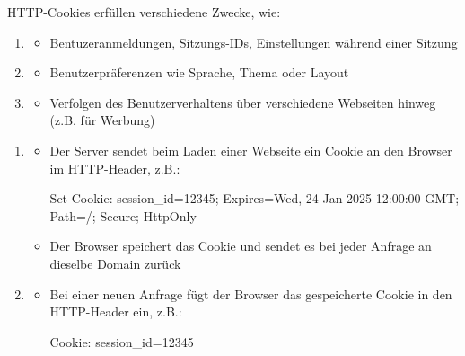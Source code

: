 \begin{infoBox}[title=Funktionen von Cookies]
    HTTP-Cookies erfüllen verschiedene Zwecke, wie:
    \begin{enumerate}
        \item {}
        \begin{itemize}
            \item Bentuzeranmeldungen, Sitzungs-IDs, Einstellungen während einer Sitzung
        \end{itemize}
        \item {}
        \begin{itemize}
            \item Benutzerpräferenzen wie Sprache, Thema oder Layout
        \end{itemize}
        \item {}
        \begin{itemize}
            \item Verfolgen des Benutzerverhaltens über verschiedene Webseiten hinweg (z.B. für Werbung)
        \end{itemize}
    \end{enumerate}
\end{infoBox}
\begin{infoBox}[title=Wie funktionieren Cookies?]
    \begin{enumerate}
        \item {}
        \begin{itemize}
            \item Der Server sendet beim Laden einer Webseite ein Cookie an den Browser im HTTP-Header, z.B.:
            \begin{codeBlock}{}
                Set-Cookie: session_id=12345; Expires=Wed, 24 Jan 2025 12:00:00 GMT; Path=/; Secure; HttpOnly
            \end{codeBlock}
            \item Der Browser speichert das Cookie und sendet es bei jeder Anfrage an dieselbe Domain zurück
        \end{itemize}
        \item {}
        \begin{itemize}
            \item Bei einer neuen Anfrage fügt der Browser das gespeicherte Cookie in den HTTP-Header ein, z.B.:
            \begin{codeBlock}{}
                Cookie: session_id=12345
            \end{codeBlock}
        \end{itemize}
    \end{enumerate}
\end{infoBox}

